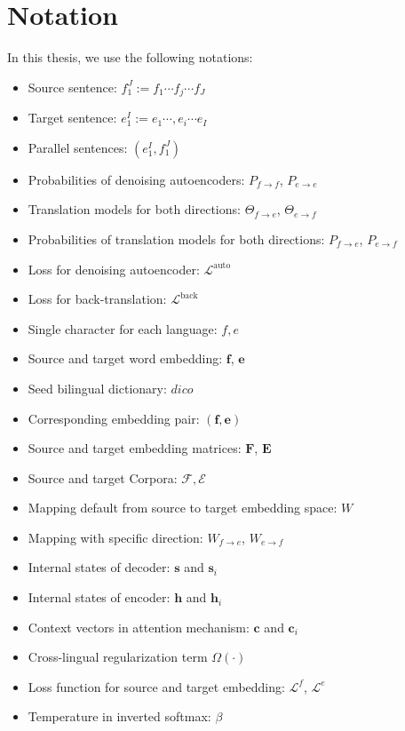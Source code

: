 \section{Notation}
In this thesis, we use the following notations:
\begin{itemize}
	\item Source sentence:  ${f_1^J:= f_1 \cdots  f_j \cdots f_J}$ 
	\item Target sentence:  ${e_1^I:= e_1 \cdots, e_i \cdots e_I}$
	\item Parallel sentences: $(e_1^I, f_1^J)$
	\item Probabilities of denoising autoencoders: $P_{f\rightarrow f}$, $P_{e\rightarrow e}$
	\item Translation models for both directions: $\Theta_{f\rightarrow e}$, $\Theta_{e \rightarrow f}$
	\item Probabilities of translation models for both directions: $P_{f\rightarrow e}$, $P_{e\rightarrow f}$
	\item Loss for denoising autoencoder: $\mathcal{L}^{\text{auto}}$
	\item Loss for back-translation: $\mathcal{L}^{\text{back}}$
	\item Single character for each language: $f,e$ 
	\item Source and target word embedding: $\bm{f}$, $\bm{e}$
	\item Seed bilingual dictionary: $dico$ 
	\item Corresponding embedding pair: $(\bm{f}, \bm{e})$
	\item Source and target embedding matrices: $\bm{F}$, $\bm{E}$
	\item Source and target Corpora: $\mathcal{F}, \mathcal{E}$
	\item Mapping default from source to target embedding space: $W$
	\item Mapping with specific direction: $W_{f\rightarrow e}$, $W_{e\rightarrow f}$
	\item Internal states of decoder: $\bm{s}$ and $\bm{s}_i$  
	\item Internal states of encoder: $\bm{h}$ and $\bm{h}_i$ 
	\item Context vectors in attention mechanism: $\bm{c}$ and $\bm{c}_i$ 
	\item Cross-lingual regularization term $\Omega(\cdot)$
	\item Loss function for source and target embedding: $\mathcal{L}^f$, $\mathcal{L}^e$
	\item Temperature in inverted softmax: $\beta$ 

\end{itemize}
